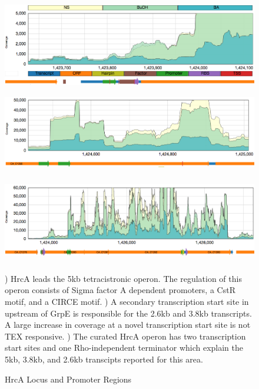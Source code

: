 \begin{figure}
{\includegraphics[width=\textwidth,height=1.5in]{images/Assembly/Examples/HrcA/HrcA-TSS.png}
\label{fig:5.16a}}
{\includegraphics[width=\textwidth,height=1.5in]{images/Assembly/Examples/HrcA/GrpE-TSS.png}
\label{fig:5.16b}}
{\includegraphics[width=\textwidth,height=1.5in]{images/Assembly/Examples/HrcA/HrcA-operon-curated.png}
\label{fig:5.16c}}
\caption{HrcA Locus and Promoter Regions}
) HrcA leads the 5kb tetracistronic operon. The regulation of this operon consists of Sigma factor A dependent promoters, a CstR motif, and a CIRCE motif. ) A secondary transcription start site in upstream of GrpE is responsible for the 2.6kb and 3.8kb transcripts. A large increase in coverage at a novel transcription start site is not TEX responsive. ) The curated HrcA operon has two transcription start sites and one Rho-independent terminator which explain the 5kb, 3.8kb, and 2.6kb transcipts reported for this area.
\end{figure}


